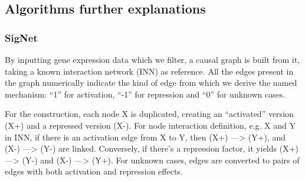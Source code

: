 \subsection{Algorithms further explanations}
\label{section:suppl:algorithms}

\subsubsection{SigNet}
\label{section:suppl:algorithms-signet}
By inputting gene expression data which we filter, a causal graph is built from it, taking a known interaction network (INN) as reference. All the edges present in the graph numerically indicate the kind of edge from which we derive the named mechanism: “1” for activation, “-1” for repression and “0” for unknown cases.

For the construction, each node X is duplicated, creating an “activated” version (X+) and a repressed version (X-). For node interaction definition, e.g. X and Y in INN, if there is an activation edge from X to Y, then (X+) —> (Y+), and (X-) —> (Y-) are linked. Conversely, if there’s a repression factor, it yields (X+) —> (Y-) and (X-) —> (Y+). For unknown cases, edges are converted to pairs of edges with both activation and repression effects.